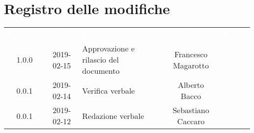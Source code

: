 \section*{Registro delle modifiche}
{
	\renewcommand{\arraystretch}{1.5}
	\centering
	\begin{longtable}{ c c  C{4cm}  c  c }
		
		\textcolor{white}{\textbf{Versione}} & \textcolor{white}{\textbf{Data}} & \textcolor{white}{\textbf{Descrizione}} & \textcolor{white}{\textbf{Autore}} & \textcolor{white}{\textbf{Ruolo}}\\
		1.0.0 & 2019-02-15 & Approvazione e rilascio del documento & Francesco Magarotto & \Res{}\\
		0.0.1 & 2019-02-14 & Verifica verbale & Alberto Bacco & \ver{}\\
		0.0.1 & 2019-02-12 & Redazione verbale & Sebastiano Caccaro & \reda{}\\
		
		
	\end{longtable}
	
}